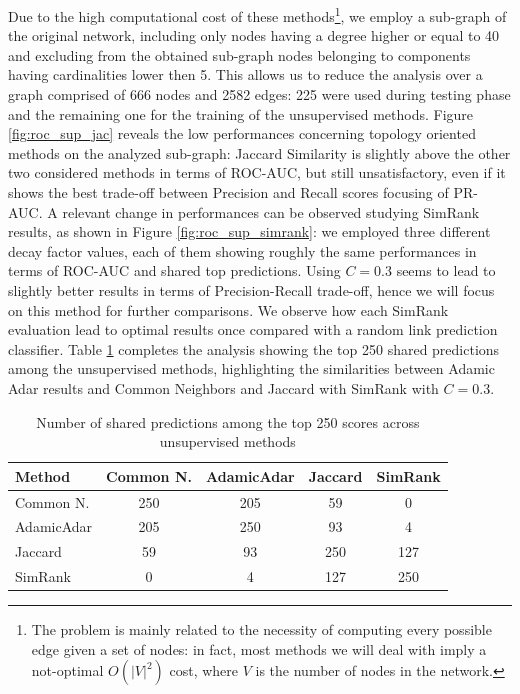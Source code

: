 \documentclass[sigchi]{acmart}
\begin{document}
Due to the high computational cost of these methods\footnote{The problem is mainly related to the necessity of computing every possible edge given a set of nodes: in fact, most methods we will deal with imply a not-optimal $O(|V|^2)$ cost, where $V$ is the number of nodes in the network.}, we employ a sub-graph of the original network, including only nodes having a degree higher or equal to 40 and excluding from the obtained sub-graph nodes belonging to components having cardinalities lower then 5. This allows us to reduce the analysis over a graph comprised of 666 nodes and 2582 edges: 225 were used during testing phase and the remaining one for the training of the unsupervised methods. Figure \ref{fig:roc_sup_jac} reveals the low performances concerning topology oriented methods on the analyzed sub-graph: Jaccard Similarity is slightly above the other two considered methods in terms of ROC-AUC, but still unsatisfactory, even if it shows the best trade-off between Precision and Recall scores focusing of PR-AUC. 
A relevant change in performances can be observed studying SimRank results, as shown in Figure \ref{fig:roc_sup_simrank}: we employed three different decay factor values, each of them showing roughly the same performances in terms of ROC-AUC and shared top predictions. Using $C=0.3$ seems to lead to slightly better results in terms of Precision-Recall trade-off, hence we will focus on this method for further comparisons. We observe how each SimRank evaluation lead to optimal results once compared with a random link prediction classifier. Table \ref{table:uns_inters} completes the analysis showing the top 250 shared predictions among the unsupervised methods, highlighting the similarities between Adamic Adar results and Common Neighbors and Jaccard with SimRank with $C=0.3$.

\renewcommand{\arraystretch}{1.3}
\begin{table}[H]
\begin{center}
\scriptsize
\begin{tabular}{ |l|c|c|c|c| } 
 \hline
 \textbf{Method} & \textbf{Common N.} & \textbf{AdamicAdar} & \textbf{Jaccard } & \textbf{SimRank}\\
 \hline
 Common N. & 250 & 205 & 59 & 0\\
 AdamicAdar  & 205 & 250 & 93 & 4\\
 Jaccard  &  59 & 93 & 250 & 127 \\
 SimRank & 0 & 4 & 127 & 250 \\

 \hline
\end{tabular}
\end{center}
\caption{\label{table:uns_inters}Number of shared predictions among the top 250 scores across unsupervised methods}
\end{table}
\end{document}
